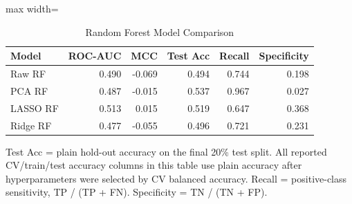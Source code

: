 \begin{table}[htbp]
\centering
\caption{Random Forest Model Comparison}
\label{tab:random_forest_comparison}
\begin{adjustbox}{max width=\linewidth}
\begin{tabular}{lrrrrr}
\toprule
Model & ROC-AUC & MCC & Test Acc & Recall & Specificity \\
\midrule
Raw RF & 0.490 & -0.069 & 0.494 & 0.744 & 0.198 \\
PCA RF & 0.487 & -0.015 & 0.537 & 0.967 & 0.027 \\
LASSO RF & 0.513 & 0.015 & 0.519 & 0.647 & 0.368 \\
Ridge RF & 0.477 & -0.055 & 0.496 & 0.721 & 0.231 \\
\bottomrule
\end{tabular}
\end{adjustbox}
\par\smallskip
\footnotesize Test Acc = plain hold-out accuracy on the final 20\% test split. All reported CV/train/test accuracy columns in this table use plain accuracy after hyperparameters were selected by CV balanced accuracy. Recall = positive-class sensitivity, TP / (TP + FN). Specificity = TN / (TN + FP).
\end{table}
